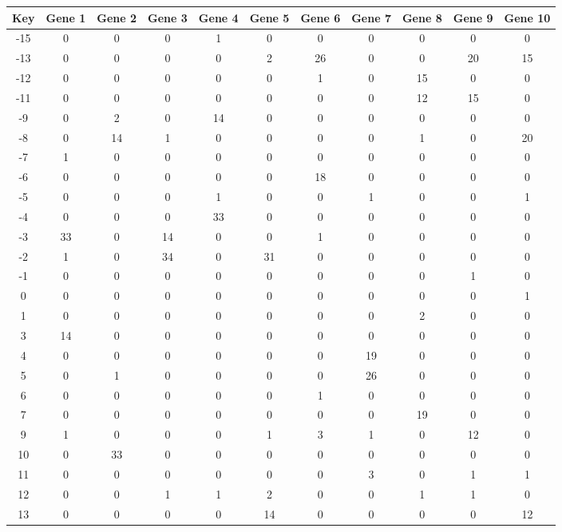 \begin{tabular}{|c|c|c|c|c|c|c|c|c|c|c|}
\hline
Key & Gene 1 & Gene 2 & Gene 3 & Gene 4 & Gene 5 & Gene 6 & Gene 7 & Gene 8 & Gene 9 & Gene 10 \\
\hline
-15 & 0 & 0 & 0 & 1 & 0 & 0 & 0 & 0 & 0 & 0 \\
-13 & 0 & 0 & 0 & 0 & 2 & 26 & 0 & 0 & 20 & 15 \\
-12 & 0 & 0 & 0 & 0 & 0 & 1 & 0 & 15 & 0 & 0 \\
-11 & 0 & 0 & 0 & 0 & 0 & 0 & 0 & 12 & 15 & 0 \\
-9 & 0 & 2 & 0 & 14 & 0 & 0 & 0 & 0 & 0 & 0 \\
-8 & 0 & 14 & 1 & 0 & 0 & 0 & 0 & 1 & 0 & 20 \\
-7 & 1 & 0 & 0 & 0 & 0 & 0 & 0 & 0 & 0 & 0 \\
-6 & 0 & 0 & 0 & 0 & 0 & 18 & 0 & 0 & 0 & 0 \\
-5 & 0 & 0 & 0 & 1 & 0 & 0 & 1 & 0 & 0 & 1 \\
-4 & 0 & 0 & 0 & 33 & 0 & 0 & 0 & 0 & 0 & 0 \\
-3 & 33 & 0 & 14 & 0 & 0 & 1 & 0 & 0 & 0 & 0 \\
-2 & 1 & 0 & 34 & 0 & 31 & 0 & 0 & 0 & 0 & 0 \\
-1 & 0 & 0 & 0 & 0 & 0 & 0 & 0 & 0 & 1 & 0 \\
0 & 0 & 0 & 0 & 0 & 0 & 0 & 0 & 0 & 0 & 1 \\
1 & 0 & 0 & 0 & 0 & 0 & 0 & 0 & 2 & 0 & 0 \\
3 & 14 & 0 & 0 & 0 & 0 & 0 & 0 & 0 & 0 & 0 \\
4 & 0 & 0 & 0 & 0 & 0 & 0 & 19 & 0 & 0 & 0 \\
5 & 0 & 1 & 0 & 0 & 0 & 0 & 26 & 0 & 0 & 0 \\
6 & 0 & 0 & 0 & 0 & 0 & 1 & 0 & 0 & 0 & 0 \\
7 & 0 & 0 & 0 & 0 & 0 & 0 & 0 & 19 & 0 & 0 \\
9 & 1 & 0 & 0 & 0 & 1 & 3 & 1 & 0 & 12 & 0 \\
10 & 0 & 33 & 0 & 0 & 0 & 0 & 0 & 0 & 0 & 0 \\
11 & 0 & 0 & 0 & 0 & 0 & 0 & 3 & 0 & 1 & 1 \\
12 & 0 & 0 & 1 & 1 & 2 & 0 & 0 & 1 & 1 & 0 \\
13 & 0 & 0 & 0 & 0 & 14 & 0 & 0 & 0 & 0 & 12 \\
\hline
\end{tabular}